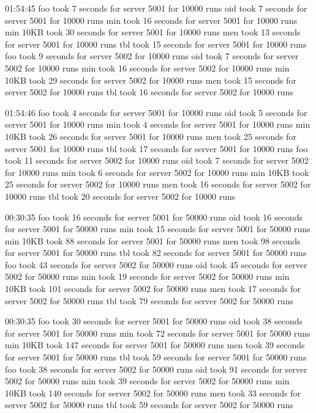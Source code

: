 \documentclass[11pt]{article}
\begin{document}
01:54:45
foo took 7 seconds for server 5001 for 10000 runs
oid took 7 seconds for server 5001 for 10000 runs
min took 16 seconds for server 5001 for 10000 runs
min 10KB took 30 seconds for server 5001 for 10000 runs
men took 13 seconds for server 5001 for 10000 runs
tbl took 15 seconds for server 5001 for 10000 runs
foo took 9 seconds for server 5002 for 10000 runs
oid took 7 seconds for server 5002 for 10000 runs
min took 16 seconds for server 5002 for 10000 runs
min 10KB took 29 seconds for server 5002 for 10000 runs
men took 15 seconds for server 5002 for 10000 runs
tbl took 16 seconds for server 5002 for 10000 runs

01:54:46
foo took 4 seconds for server 5001 for 10000 runs
oid took 5 seconds for server 5001 for 10000 runs
min took 4 seconds for server 5001 for 10000 runs
min 10KB took 26 seconds for server 5001 for 10000 runs
men took 25 seconds for server 5001 for 10000 runs
tbl took 17 seconds for server 5001 for 10000 runs
foo took 11 seconds for server 5002 for 10000 runs
oid took 7 seconds for server 5002 for 10000 runs
min took 6 seconds for server 5002 for 10000 runs
min 10KB took 25 seconds for server 5002 for 10000 runs
men took 16 seconds for server 5002 for 10000 runs
tbl took 20 seconds for server 5002 for 10000 runs


00:30:35
foo took 16 seconds for server 5001 for 50000 runs
oid took 16 seconds for server 5001 for 50000 runs
min took 15 seconds for server 5001 for 50000 runs
min 10KB took 88 seconds for server 5001 for 50000 runs
men took 98 seconds for server 5001 for 50000 runs
tbl took 82 seconds for server 5001 for 50000 runs
foo took 43 seconds for server 5002 for 50000 runs
oid took 45 seconds for server 5002 for 50000 runs
min took 19 seconds for server 5002 for 50000 runs
min 10KB took 101 seconds for server 5002 for 50000 runs
men took 17 seconds for server 5002 for 50000 runs
tbl took 79 seconds for server 5002 for 50000 runs

00:30:35
foo took 30 seconds for server 5001 for 50000 runs
oid took 38 seconds for server 5001 for 50000 runs
min took 72 seconds for server 5001 for 50000 runs
min 10KB took 147 seconds for server 5001 for 50000 runs
men took 39 seconds for server 5001 for 50000 runs
tbl took 59 seconds for server 5001 for 50000 runs
foo took 38 seconds for server 5002 for 50000 runs
oid took 91 seconds for server 5002 for 50000 runs
min took 39 seconds for server 5002 for 50000 runs
min 10KB took 140 seconds for server 5002 for 50000 runs
men took 33 seconds for server 5002 for 50000 runs
tbl took 59 seconds for server 5002 for 50000 runs
\end{document}

